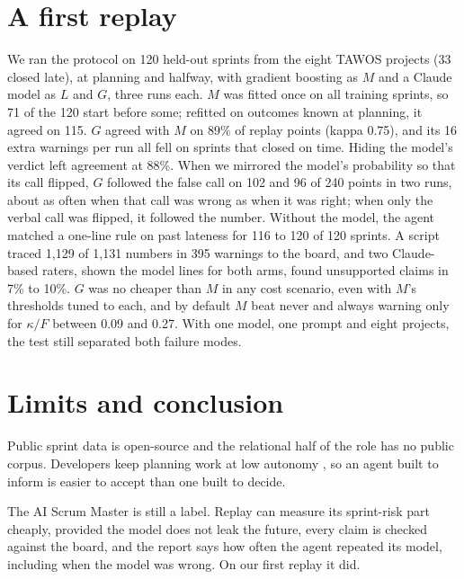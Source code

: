 \documentclass[pmlr]{jmlr}
\begin{document}
\section{A first replay}
\label{sec:study}

We ran the protocol on 120 held-out sprints from the eight TAWOS projects (33 closed late), at planning and halfway, with gradient boosting as $M$ and a Claude model as $L$ and $G$, three runs each. $M$ was fitted once on all training sprints, so 71 of the 120 start before some; refitted on outcomes known at planning, it agreed on 115. $G$ agreed with $M$ on 89\% of replay points (kappa 0.75), and its 16 extra warnings per run all fell on sprints that closed on time. Hiding the model's verdict left agreement at 88\%. When we mirrored the model's probability so that its call flipped, $G$ followed the false call on 102 and 96 of 240 points in two runs, about as often when that call was wrong as when it was right; when only the verbal call was flipped, it followed the number. Without the model, the agent matched a one-line rule on past lateness for 116 to 120 of 120 sprints. A script traced 1,129 of 1,131 numbers in 395 warnings to the board, and two Claude-based raters, shown the model lines for both arms, found unsupported claims in 7\% to 10\%. $G$ was no cheaper than $M$ in any cost scenario, even with $M$'s thresholds tuned to each, and by default $M$ beat never and always warning only for $\kappa/F$ between 0.09 and 0.27. With one model, one prompt and eight projects, the test still separated both failure modes.

\section{Limits and conclusion}

Public sprint data is open-source and the relational half of the role has no public corpus. Developers keep planning work at low autonomy \citep{choudhuri}, so an agent built to inform is easier to accept than one built to decide.

The AI Scrum Master is still a label. Replay can measure its sprint-risk part cheaply, provided the model does not leak the future, every claim is checked against the board, and the report says how often the agent repeated its model, including when the model was wrong. On our first replay it did.
\end{document}
